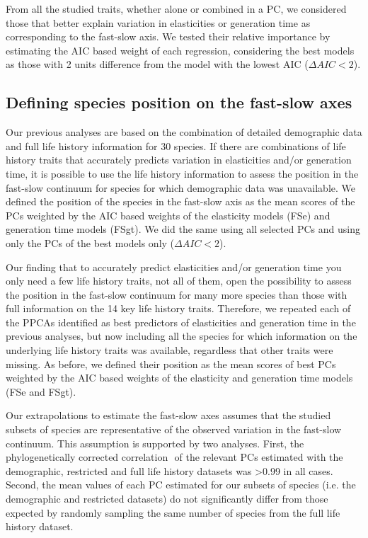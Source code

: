 From all the studied traits, whether alone or combined in a PC, we 
considered those that better explain variation in elasticities or generation 
time as corresponding to the fast-slow axis. We tested their relative 
importance by estimating the AIC based weight of each regression, considering 
the best models as those with 2 units difference from the model with the lowest 
AIC ($\Delta AIC < 2$).


\subsection*{Defining species position on the fast-slow axes}

Our previous analyses are based on the combination of detailed demographic data 
and full life history information for 30 species. If there are combinations of 
life history traits that accurately predicts variation in elasticities and/or 
generation time, it is possible to use the life history information to assess 
the position in the fast-slow continuum for species for which demographic data 
was unavailable. We defined the position of the species in the fast-slow axis 
as the mean scores of the PCs weighted by the AIC based weights 
of the elasticity models (FSe) and generation time models (FSgt). We did the 
same using all selected PCs and using only the PCs of the best models only 
($\Delta AIC < 2$).

Our finding that to accurately predict elasticities and/or generation time you 
only need a few life history traits, not all of them, open the possibility to 
assess the position in the fast-slow continuum for many more species than those 
with full information on the 14 key life history traits. Therefore, we repeated 
each of the PPCAs identified as best predictors of elasticities and generation 
time in the previous analyses, but now including all the species for which 
information on the underlying life history traits was available, regardless that 
other traits were missing. As before, we defined their position as the mean 
scores of best PCs weighted by the AIC based weights of the elasticity 
and generation time models (FSe and FSgt).

Our extrapolations to estimate the fast-slow axes assumes that the studied
subsets of species are representative of the observed variation in the fast-slow
continuum.
This assumption is supported by two analyses. First, the phylogenetically 
corrected correlation \citep{Revell2009a}⁠ of the relevant PCs estimated with
the demographic, restricted and full life history datasets was
\textgreater{0.99} in all cases.
Second, the mean values of each PC estimated for our subsets of species (i.e.
the demographic and restricted datasets) do not significantly differ from those
expected by randomly sampling the same number of species from the full life
history dataset.



